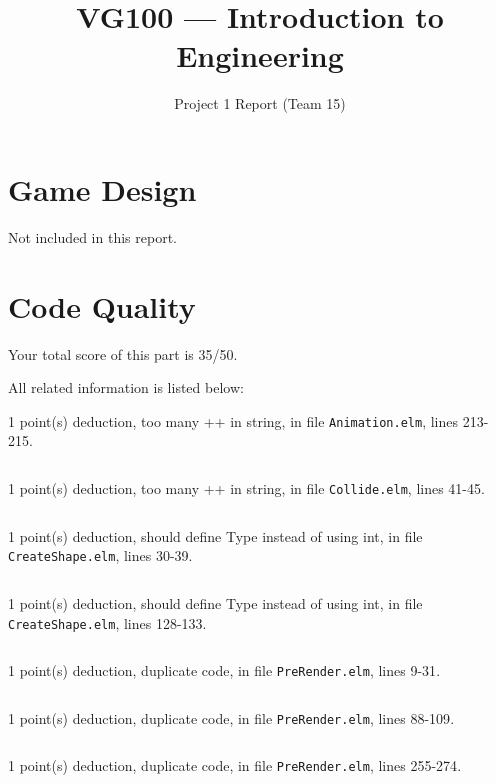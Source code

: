 \documentclass{article}
\title{VG100 --- Introduction to\\ Engineering}
\subtitle{Project 1 Report (Team 15)}
\begin{document}
\maketitle

\section{Game Design}

Not included in this report.

\section{Code Quality}

Your total score of this part is 35/50. \medskip

All related information is listed below: \medskip

1 point(s) {\color{red}deduction}, too many ++ in string, in file {\color{blue}\texttt{Animation.elm}}, lines {\color{blue}213-215}.

\inputminted[firstline=213,lastline=215]{elm}{Animation.elm}

1 point(s) {\color{red}deduction}, too many ++ in string, in file {\color{blue}\texttt{Collide.elm}}, lines {\color{blue}41-45}.

\inputminted[firstline=41,lastline=45]{elm}{Collide.elm}

1 point(s) {\color{red}deduction}, should define Type instead of using int, in file {\color{blue}\texttt{CreateShape.elm}}, lines {\color{blue}30-39}.

\inputminted[firstline=30,lastline=39]{elm}{CreateShape.elm}

1 point(s) {\color{red}deduction}, should define Type instead of using int, in file {\color{blue}\texttt{CreateShape.elm}}, lines {\color{blue}128-133}.

\inputminted[firstline=128,lastline=133]{elm}{CreateShape.elm}

1 point(s) {\color{red}deduction}, duplicate code, in file {\color{blue}\texttt{PreRender.elm}}, lines {\color{blue}9-31}.

\inputminted[firstline=9,lastline=31]{elm}{PreRender.elm}

1 point(s) {\color{red}deduction}, duplicate code, in file {\color{blue}\texttt{PreRender.elm}}, lines {\color{blue}88-109}.

\inputminted[firstline=88,lastline=109]{elm}{PreRender.elm}

1 point(s) {\color{red}deduction}, duplicate code, in file {\color{blue}\texttt{PreRender.elm}}, lines {\color{blue}255-274}.
\end{document}
